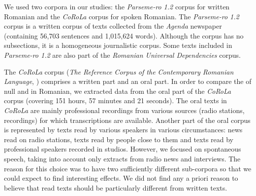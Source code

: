 \documentclass[output=paper,colorlinks,citecolor=brown]{langscibook}
\begin{document}
We used two corpora in our studies: the \textit{Parseme-ro 1.2} corpus for written Romanian and the \textit{CoRoLa} corpus for spoken Romanian. 
The \textit{Parseme-ro 1.2} corpus \citep{savary2018parseme} is a written corpus of texts collected from the \textit{Agenda} newspaper (containing 56,703 sentences and 1,015,624 words). Although the corpus has no subsections, it is a homogeneous journalistic corpus. Some texts included in \textit{Parseme-ro 1.2} are also part of the \textit{Romanian Universal Dependencies} corpus. 


The \textit{CoRoLa} corpus (\textit{The Reference Corpus of the Contemporary Romanian Language}, \citealt{mititelu2018reference}) comprises a written part and an oral part. In order to compare the  of null and  in Romanian, we extracted data from the oral part of the \textit{CoRoLa} corpus (covering 151 hours, 57 minutes and 21 seconds). The oral texts in \textit{CoRoLa} are mainly professional recordings from various sources (radio stations, recordings) for which transcriptions are available. Another part of the oral corpus is represented by texts read by various speakers in various circumstances: news read on radio stations, texts read by people close to them and texts read by professional speakers recorded in studios. However, we focused on spontaneous speech, taking into account only extracts from radio news and interviews. The reason for this choice was to have two sufficiently different sub-corpora so that we could expect to find interesting effects. We did not find any a priori reason to believe that read texts should be particularly different from written texts.
\end{document}
